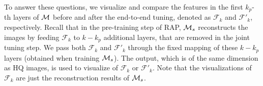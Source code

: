\documentclass[10pt,twocolumn,twoside]{IEEEtran} %
\begin{document}
To answer these questions, we visualize and compare the features in the first $k_p$-th layers of ${\mathcal{M}}$ before and after the end-to-end tuning, denoted as $\mathcal{F}_k$ and $\mathcal{F}'_k$, respectively.
Recall that in the pre-training step of RAP, ${\mathcal{M}}_s$ reconstructs the images by feeding $\mathcal{F}_k$ to $k-k_p$ additional layers, that are removed in the joint tuning step. We pass both $\mathcal{F}_k$ and $\mathcal{F}'_k$ through the fixed mapping of these $k-k_p$ layers (obtained when training ${\mathcal{M}}_s$). The output, which is of the same dimension as HQ images, is used to visualize of $\mathcal{F}_k$ or $\mathcal{F}'_k$. Note that the visualizations of $\mathcal{F}_k$ are just the reconstruction results of ${\mathcal{M}}_s$. 
\end{document}
